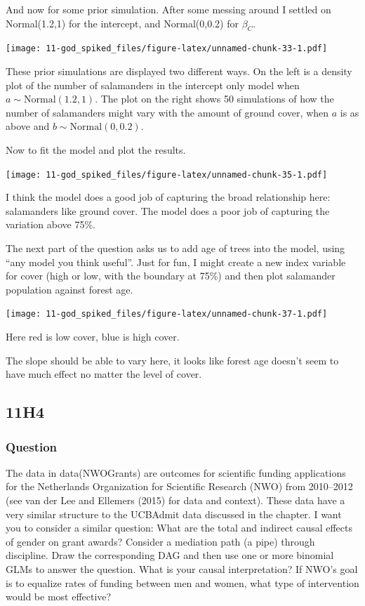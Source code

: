 \documentclass[
]{book}
\begin{document}
And now for some prior simulation. After some messing around I settled on Normal(1.2,1) for the intercept, and Normal(0,0.2) for \(\beta_C\).

\texttt{[image: 11-god\_spiked\_files/figure-latex/unnamed-chunk-33-1.pdf]}

These prior simulations are displayed two different ways. On the left is a density plot of the number of salamanders in the intercept only model when \(a \sim \text{Normal}(1.2,1)\). The plot on the right shows 50 simulations of how the number of salamanders might vary with the amount of ground cover, when \(a\) is as above and \(b \sim \text{Normal}(0,0.2)\).

Now to fit the model and plot the results.

\texttt{[image: 11-god\_spiked\_files/figure-latex/unnamed-chunk-35-1.pdf]}

I think the model does a good job of capturing the broad relationship here: salamanders like ground cover. The model does a poor job of capturing the variation above 75\%.

The next part of the question asks us to add age of trees into the model, using ``any model you think useful''. Just for fun, I might create a new index variable for cover (high or low, with the boundary at 75\%) and then plot salamander population against forest age.

\texttt{[image: 11-god\_spiked\_files/figure-latex/unnamed-chunk-37-1.pdf]}

Here red is low cover, blue is high cover.

The slope should be able to vary here, it looks like forest age doesn't seem to have much effect no matter the level of cover.

\hypertarget{h4-4}{%
\subsection*{11H4}\label{h4-4}}

\hypertarget{question-96}{%
\subsubsection*{Question}\label{question-96}}

The data in data(NWOGrants) are outcomes for scientific funding applications for the Netherlands Organization for Scientific Research (NWO) from 2010--2012 (see van der Lee and Ellemers (2015) for data and context). These data have a very similar structure to the UCBAdmit data discussed in the chapter. I want you to consider a similar question: What are the total and indirect causal effects of gender on grant awards? Consider a mediation path (a pipe) through discipline. Draw the corresponding DAG and then use one or more binomial GLMs to answer the question. What is your causal interpretation? If NWO's goal is to equalize rates of funding between men and women, what type of intervention would be most effective?
\end{document}
